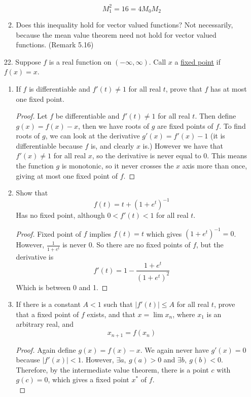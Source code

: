 \documentclass[hidelinks,12pt]{article}
\renewcommand{\leq}{\leqslant}
\begin{document}
\begin{enumerate}
\begin{enumerate}[label=(\alph*).]
\[               M_{1}^{2}=16=4M_{0}M_{2}
           \]
            \item Does this inequality hold for vector valued functions? Not necessarily, because the mean value theorem need not hold for vector valued functions. (Remark 5.16)
        \end{enumerate}   
    \item[22.] Suppose \(f\) is a real function on \((-\infty,\infty)\). Call \(x\) a \underline{fixed point} if \(f(x)=x\).
        \begin{enumerate}[label=(\alph*).]
            \item If \(f\) is differentiable and \(f'(t)\neq1\) for all real \(t\), prove that \(f\) has at most one fixed point.
                \begin{proof}
                Let \(f\) be differentiable and \(f'(t)\neq1\) for all real \(t\). Then define \(g(x)=f(x)-x\), then we have roots of \(g\) are fixed points of \(f\). To find roots of \(g\), we can look at the derivative \(g'(x)=f'(x)-1\) (it is differentiable because \(f\) is, and clearly \(x\) is.) However we have that \(f'(x)\neq1\) for all real \(x\), so the derivative is never equal to 0. This means the function \(g\) is monotonic, so it never crosses the \(x\) axis more than once, giving at most one fixed point of \(f\).
                \end{proof}
            \item Show that \[
            f(t)=t+(1+e^{t})^{-1}
            \]
           Has no fixed point, although \(0<f'(t)<1\) for all real \(t\).
           \begin{proof}
           Fixed point of \(f\) implies \(f(t)=t\) which gives \((1+e^{t})^{-1}=0\). However, \(\frac{1}{1+e^{t}}\) is never 0. So there are no fixed points of \(f\), but the derivative is 
           \[
           f'(t)=1-\frac{1+e^{t}}{(1+e^{t})^{2}}
           \]
          Which is between 0 and 1. 
           \end{proof}
       \item If there is a constant \(A<1\) such that \(|f'(t)|\leq A\) for all real \(t\), prove that a fixed point of \(f\) exists, and that \(x=\lim x_{n}\), where \(x_{1}\) is an arbitrary real, and \[
       x_{n+1}=f(x_{n})
       \]
      \begin{proof}
          Again define \(g(x)=f(x)-x\). We again never have \(g'(x)=0\) because \(|f'(x)|<1\). However, \(\exists a,\ g(a)>0\) and \(\exists b,\ g(b)<0\). Therefore, by the intermediate value theorem, there is a point \(c\) with \(g(c)=0\), which gives a fixed point \(x^{*}\) of \(f\).\\

\end{proof}
\end{enumerate}
\end{enumerate}
\end{document}
